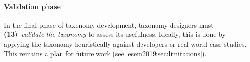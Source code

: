 \paragraph{Validation phase} In the final phase of taxonomy development, taxonomy designers must \textbf{(13)}~\textit{validate the taxonomy} to assess its usefulness. Ideally, this is done by applying the taxonomy heuristically against developers or real-world case-studies. This remains a plan for future work (see \cref{esem2019:sec:limitations}).


%
